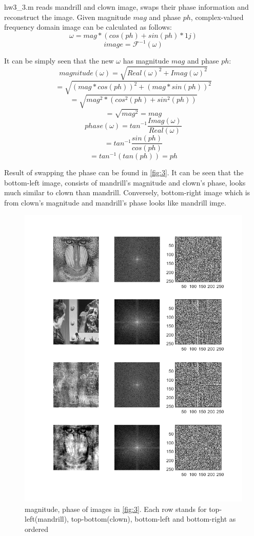 \documentclass[extendedabs]{bmvc2k}
\begin{document}
hw3\_3.m reads mandrill and clown image, swaps their phase information and reconstruct the image.
Given magnitude $mag$ and phase $ph$, complex-valued frequency domain image can be calculated as follows:
\[\omega = mag * (cos(ph) + sin(ph) * 1j)\]
\[image = \mathcal{F}^{-1}(\omega)\]

It can be simply seen that the new $\omega$ has magnitude $mag$ and phase $ph$:
\[magnitude(\omega) = \sqrt{Real(\omega)^2 + Imag(\omega)^2}\]
\[= \sqrt{(mag * cos(ph))^2 + (mag * sin(ph))^2}\]
\[= \sqrt{mag^2 * (cos^2(ph) + sin^2(ph))}\]
\[= \sqrt{mag^2} = mag\] 
\[phase(\omega) = tan^{-1}\frac{Imag(\omega)}{Real(\omega)}\]
\[= tan^{-1}\frac{sin(ph)}{cos(ph)}\]
\[= tan^{-1}(tan(ph)) = ph\]

Result of swapping the phase can be found in \figurename{\ref{fig:3}}.
It can be seen that the bottom-left image, consists of mandrill's magnitude and clown's phase,
looks much similar to clown than mandrill. Conversely, bottom-right image which is from clown's
magnitude and mandrill's phase looks like mandrill imge.

\begin{figure}[h]
    \centering
    \includegraphics[width=\linewidth]{hw3_3_2}
    \caption{magnitude, phase of images in \figurename{\ref{fig:3}}. Each row stands for
    top-left(mandrill), top-bottom(clown), bottom-left and bottom-right as ordered}
    \label{fig:4}
\end{figure}
\end{document}
